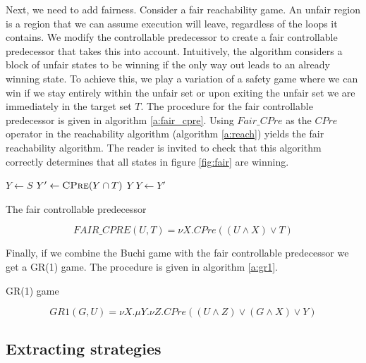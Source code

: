 \documentclass[a4paper,twoside,openright,11pt]{book}
\theoremstyle{definition}
\begin{document}
Next, we need to add fairness. Consider a fair reachability game. An unfair region is a region that we can assume execution will leave, regardless of the loops it contains. We modify the controllable predecessor to create a fair controllable predecessor that takes this into account. Intuitively, the algorithm considers a block of unfair states to be winning if the only way out leads to an already winning state. To achieve this, we play a variation of a safety game where we can win if we stay entirely within the unfair set or upon exiting the unfair set we are immediately in the target set $T$. The procedure for the fair controllable predecessor is given in algorithm \ref{a:fair_cpre}. Using $Fair\_CPre$ as the $CPre$ operator in the reachability algorithm (algorithm \ref{a:reach}) yields the fair reachability algorithm. The reader is invited to check that this algorithm correctly determines that all states in figure \ref{fig:fair} are winning.

\begin{algorithm}[t]
\begin{algorithmic}
\State $Y \gets S$
\Loop
\State $Y' \gets \Call{CPre}{Y \cap T}$
\State\Return $Y$\EndIf
\State $Y \gets Y'$
\EndLoop
\EndFunction
\end{algorithmic}
\caption{The fair controllable predecessor}
\label{a:fair_cpre}
\end{algorithm}

\begin{equation}
FAIR\_CPRE(U, T) = \nu X. CPre((U \wedge X) \vee T)
\label{eqn:mu_fair}
\end{equation}

Finally, if we combine the Buchi game with the fair controllable predecessor we get a GR(1) game. The procedure is given in algorithm \ref{a:gr1}.

\begin{algorithm}[t]
\begin{algorithmic}
\State\Return {}
\EndFunction
\end{algorithmic}
\caption{GR(1) game}
\label{a:gr1}
\end{algorithm}

\begin{equation}
GR1(G, U) = \nu X. \mu Y. \nu Z. CPre((U \wedge Z) \vee (G \wedge X) \vee Y)
\label{equ:mu_gr1}
\end{equation}

\subsection{Extracting strategies}
\end{document}
